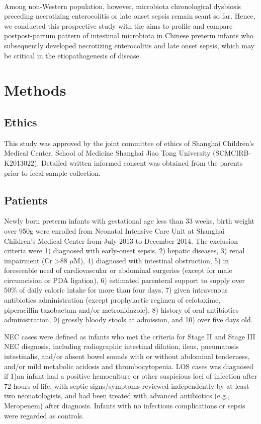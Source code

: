 \documentclass[fleqn,10pt,lineno]{wlpeerj} %
\begin{document}
\

\noindent
 Among non-Western population, however, microbiota chronological dysbiosis preceding necrotizing enterocolitis or late onset sepsis remain scant so far. Hence, we conducted this prospective study with the aims to profile and compare postpost-partum pattern of intestinal microbiota in Chinese preterm infants who subsequently developed necrotizing enterocolitis and late onset sepsis, which may be critical in the etiopathogenesis of disease.

\section*{Methods}
  \subsection*{Ethics}
  This study was approved by the joint committee of ethics of Shanghai Children’s Medical Center, School of Medicine Shanghai Jiao Tong University (SCMCIRB-K2013022). Detailed written informed consent was obtained from the parents prior to fecal sample collection.

  \subsection*{Patients}
  Newly born preterm infants with gestational age less than 33 weeks, birth weight over 950g were enrolled from Neonatal Intensive Care Unit at Shanghai Children’s Medical Center from July 2013 to December 2014. The exclusion criteria were 1) diagnosed with early-onset sepsis, 2) hepatic diseases, 3) renal impairment (Cr \textgreater 88 $\mu$M), 4) diagnosed with intestinal obstruction, 5) in foreseeable need of cardiovascular or abdominal surgeries (except for male circumcision or PDA ligation), 6) estimated parenteral support to supply over 50\% of daily caloric intake for more than four days, 7) given intravenous antibiotics administration (except prophylactic regimen of cefotaxime, piperacillin-tazobactam and/or metronidazole), 8) history of oral antibiotics administration, 9) grossly bloody stools at admission, and 10) over five days old.

  \noindent
  NEC cases were defined as infants who met the criteria for Stage II and Stage III NEC disgnosis\citep{bell1978neonatal}, including radiographic intestinal dilation, ileus, pneumatosis intestinalis, and/or absent bowel sounds with or without abdominal tenderness, and/or mild metabolic acidosis and thrombocytopenia. LOS cases was diagnosed if 1)an infant had a positive hemoculture or other suspicious loci of infection after 72 hours of life, with septic signs/symptoms reviewed independently by at least two neonatologists, and had been treated with advanced antibiotics (e.g., Meropenem) after diagnosis. Infants with no infectious complications or sepsis were regarded as controls.
\end{document}
